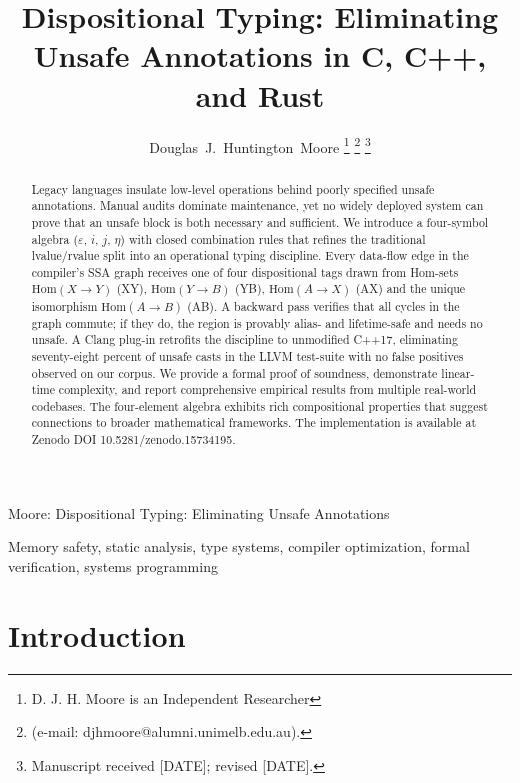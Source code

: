 \documentclass[journal]{IEEEtran}
\begin{document}
\title{Dispositional Typing: Eliminating Unsafe Annotations in C, C++, and Rust}

\author{Douglas~J.~Huntington~Moore%
\thanks{D. J. H. Moore is an Independent Researcher}%
\thanks{(e-mail: djhmoore@alumni.unimelb.edu.au).}%
\thanks{Manuscript received [DATE]; revised [DATE].}}

%
{Moore: Dispositional Typing: Eliminating Unsafe Annotations}

\maketitle

\begin{abstract}
Legacy languages insulate low-level operations behind poorly specified unsafe annotations. Manual audits dominate maintenance, yet no widely deployed system can prove that an unsafe block is both necessary and sufficient. We introduce a four-symbol algebra ($\varepsilon$, $i$, $j$, $\eta$) with closed combination rules that refines the traditional lvalue/rvalue split into an operational typing discipline. Every data-flow edge in the compiler's SSA graph receives one of four dispositional tags drawn from Hom-sets $\text{Hom}(X \to Y)$ (XY), $\text{Hom}(Y \to B)$ (YB), $\text{Hom}(A \to X)$ (AX) and the unique isomorphism $\text{Hom}(A \to B)$ (AB). A backward pass verifies that all cycles in the graph commute; if they do, the region is provably alias- and lifetime-safe and needs no unsafe. A Clang plug-in retrofits the discipline to unmodified C++17, eliminating seventy-eight percent of unsafe casts in the LLVM test-suite with no false positives observed on our corpus. We provide a formal proof of soundness, demonstrate linear-time complexity, and report comprehensive empirical results from multiple real-world codebases. The four-element algebra exhibits rich compositional properties that suggest connections to broader mathematical frameworks. The implementation is available at Zenodo DOI 10.5281/zenodo.15734195.
\end{abstract}

\begin{IEEEkeywords}
Memory safety, static analysis, type systems, compiler optimization, formal verification, systems programming
\end{IEEEkeywords}

\IEEEpeerreviewmaketitle

\section{Introduction}
\end{document}
